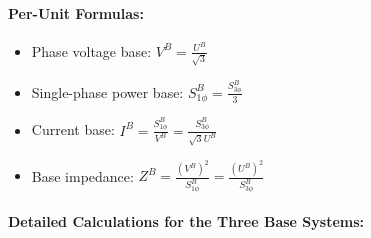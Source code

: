 \paragraph{Per-Unit Formulas:}
\begin{itemize}
    \item Phase voltage base: $V^B = \frac{U^B}{\sqrt{3}}$
    \item Single-phase power base: $S_{1\phi}^B = \frac{S_{3\phi}^B}{3}$
    \item Current base: $I^B = \frac{S_{1\phi}^B}{V^B} = \frac{S_{3\phi}^B}{\sqrt{3} U^B}$
    \item Base impedance: $Z^B = \frac{(V^B)^2}{S_{1\phi}^B} = \frac{(U^B)^2}{S_{3\phi}^B}$
\end{itemize}

\paragraph{Detailed Calculations for the Three Base Systems:}
